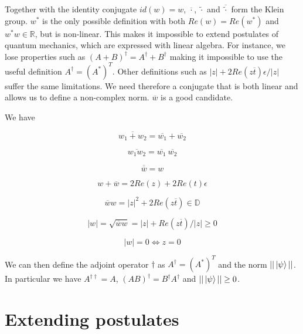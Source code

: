 \documentclass{article}
\newcommand{\R}{\mathbb{R}}
\newcommand{\D}{\mathbb{D}}
\newcommand{\e}{\epsilon}
\newcommand{\til}{\widetilde}
\renewcommand{\bar}{\overline}
\begin{document}
Together with the identity conjugate $id(w) = w$, $\bar{\cdot}$, $\til{\cdot}$ and $\bar{\til{\cdot}}$ form the Klein group. $w^*$ is the only possible definition with both $Re(w) = Re(w^*)$ and $w^*w \in \R$, but is non-linear. This makes it impossible to extend postulates of quantum mechanics, which are expressed with linear algebra. For instance, we lose properties such as $(A + B)^\dagger = A^\dagger + B^\dagger$ making it impossible to use the useful definition $A^\dagger = (A^*)^T$. Other definitions such as $|z| + 2Re(z\bar{t})\e/|z|$ suffer the same limitations. We need therefore a conjugate that is both linear and allows us to define a non-complex norm. $\bar{w}$ is a good candidate.

We have

\begin{equation}
\bar{w_1 + w_2} = \bar{w_1} + \bar{w_2}
\end{equation}

\begin{equation}
\bar{w_1  w_2} = \bar{w_1} ~ \bar{w_2}
\end{equation}

\begin{equation}
\bar{\bar{w}} = w
\end{equation}

\begin{equation}
w + \bar{w} = 2 Re(z) + 2 Re(t) \e
\end{equation}

\begin{equation}
\bar{w}w = |z|^2 + 2 Re(z\bar{t}) \in \D
\end{equation}

\begin{equation}
|w| = \sqrt{\bar{w}w} = |z| + Re(z\bar{t})/|z| \geq 0
\end{equation}

\begin{equation}
|w| = 0 \iff z = 0
\end{equation}

We can then define the adjoint operator $\dagger$ as $A^\dagger = (A^*)^T$ and the norm $||\ket{\psi}||$. In particular we have $A^{\dagger \dagger} = A$, $(AB)^\dagger = B^\dagger A^\dagger$ and $||\ket{\psi}|| \geq 0$.

\section{Extending postulates}
\end{document}
